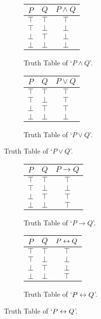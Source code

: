 \begin{figure}[H]
\begin{subfigure}{.5\textwidth}
\begin{center}
    \begin{tabular}{cc|c}
         $P$&$Q$&$P \land {Q} $\\
         \hline
         $\top$&$\top$&$\top$\\
         $\top$&$\bot$&$\bot$\\
         $\bot$&$\top$&$\bot$\\
         $\bot$&$\bot$&$\bot$
    \end{tabular}
\end{center}
\caption{Truth Table of `$P \land Q$'.}
\label{fig:ttpandq}
\end{subfigure}
\begin{subfigure}{.5\textwidth}
\begin{center}
    \begin{tabular}{cc|c}
         $P$&$Q$&$P\lor{Q} $\\
         \hline
         $\top$&$\top$&$\top$\\
         $\top$&$\bot$&$\top$\\
         $\bot$&$\top$&$\top$\\
         $\bot$&$\bot$&$\bot$
    \end{tabular}
\end{center}
\caption{Truth Table of `$P \lor Q$'.}
\label{fig:ttporq}
\end{subfigure}
\end{figure}

\begin{figure}[H]
\begin{subfigure}{.5\textwidth}
\begin{center}
    \begin{tabular}{cc|c}
         $P$&$Q$&$P\to{Q} $\\
         \hline
         $\top$&$\top$&$\top$\\
         $\top$&$\bot$&$\bot$\\
         $\bot$&$\top$&$\top$\\
         $\bot$&$\bot$&$\top$
    \end{tabular}
\end{center}
\caption{Truth Table of `$P \to Q$'.}
\label{fig:ttptoq}
\end{subfigure}
\begin{subfigure}{.5\textwidth}
\begin{center}
    \begin{tabular}{cc|c}
         $P$&$Q$&$P\leftrightarrow{Q} $\\
         \hline
         $\top$&$\top$&$\top$\\
         $\top$&$\bot$&$\bot$\\
         $\bot$&$\top$&$\bot$\\
         $\bot$&$\bot$&$\top$
    \end{tabular}
\end{center}
\caption{Truth Table of `$P \leftrightarrow Q$'.}
\label{fig:ttpiffq}
\end{subfigure}
\end{figure}

